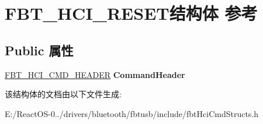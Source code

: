 \hypertarget{struct_f_b_t___h_c_i___r_e_s_e_t}{}\section{F\+B\+T\+\_\+\+H\+C\+I\+\_\+\+R\+E\+S\+E\+T结构体 参考}
\label{struct_f_b_t___h_c_i___r_e_s_e_t}
\subsection*{Public 属性}
\begin{DoxyCompactItemize}
\item 
\mbox{\label{struct_f_b_t___h_c_i___r_e_s_e_t_acc80ff413acf97dd8c9e4d41fc33fe64}} 
\hyperlink{struct_f_b_t___h_c_i___c_m_d___h_e_a_d_e_r}{F\+B\+T\+\_\+\+H\+C\+I\+\_\+\+C\+M\+D\+\_\+\+H\+E\+A\+D\+ER} {\bfseries Command\+Header}
\end{DoxyCompactItemize}


该结构体的文档由以下文件生成\+:\begin{DoxyCompactItemize}
\item 
E\+:/\+React\+O\+S-\/0../drivers/bluetooth/fbtusb/include/fbt\+Hci\+Cmd\+Structs.\+h\end{DoxyCompactItemize}

